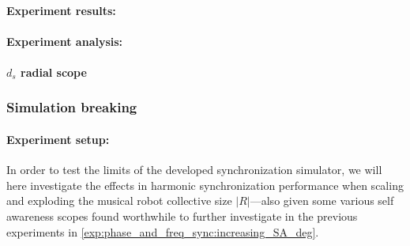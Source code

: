 				\paragraph{Experiment results:\nl}
				

				\paragraph{Experiment analysis:\nl}
			
			
			\paragraph{$d_s$ radial scope}
	
	
		\subsubsection{Simulation breaking}
		
			\paragraph{Experiment setup:\nl}
			
			In order to test the limits of the developed synchronization simulator, we will here investigate the effects in harmonic synchronization performance when scaling and exploding the musical robot collective size $|R|$—also given some various self awareness scopes found worthwhile to further investigate in the previous experiments in \ref{exp:phase_and_freq_sync:increasing_SA_deg}.
	
